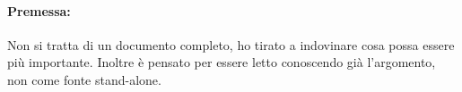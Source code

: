 \documentclass[11pt]{article}
\begin{document}
    
	\maketitle
    
    \paragraph{Premessa:} Non si tratta di un documento completo, ho tirato a indovinare cosa possa essere più importante. Inoltre è pensato per essere letto conoscendo già l'argomento, non come fonte stand-alone.
    
	\tableofcontents
	\newpage	

    

    

    

    
    
    
    
    
\end{document}
